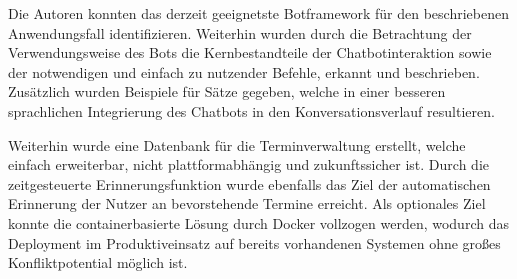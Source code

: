 Die Autoren konnten das derzeit geeignetste Botframework für den beschriebenen Anwendungsfall identifizieren. Weiterhin wurden durch die Betrachtung der Verwendungsweise des Bots die Kernbestandteile der Chatbotinteraktion sowie der notwendigen und einfach zu nutzender Befehle, erkannt und beschrieben. Zusätzlich wurden Beispiele für Sätze gegeben, welche in einer besseren sprachlichen Integrierung des Chatbots in den Konversationsverlauf resultieren. 

Weiterhin wurde eine Datenbank für die Terminverwaltung erstellt, welche einfach erweiterbar, nicht plattformabhängig und zukunftssicher ist. Durch die zeitgesteuerte Erinnerungsfunktion wurde ebenfalls das Ziel der automatischen Erinnerung der Nutzer an bevorstehende Termine erreicht. Als optionales Ziel konnte die containerbasierte Lösung durch Docker vollzogen werden, wodurch das Deployment im Produktiveinsatz auf bereits vorhandenen Systemen ohne großes Konfliktpotential möglich ist.

